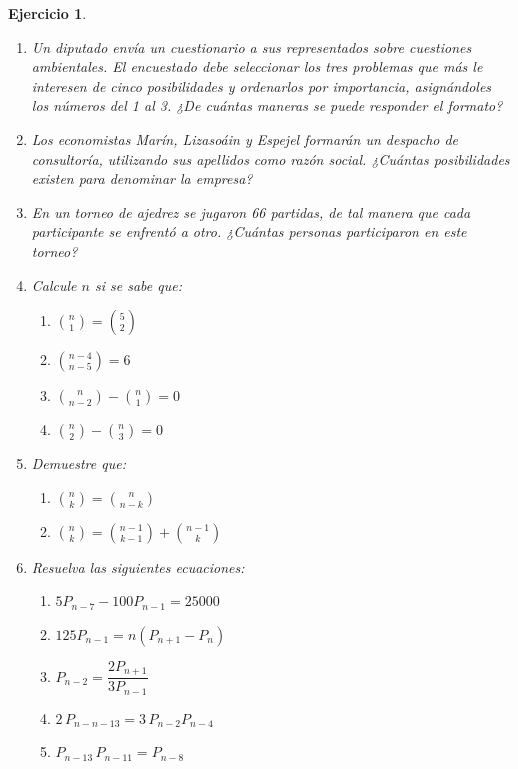 \documentclass[12pt,twoside]{article}
\newtheorem{Ejer}{Ejercicio}
\begin{document}
\begin{Ejer}
\begin{enumerate}

\item Un diputado envía un cuestionario a sus representados sobre cuestiones ambientales. El encuestado debe seleccionar los tres problemas que más le interesen de cinco posibilidades y ordenarlos por importancia, asignándoles los números del 1 al 3. ¿De cuántas maneras se puede responder el formato?

\item Los economistas Marín, Lizasoáin y Espejel formarán un despacho de consultoría, utilizando sus apellidos como razón social. ¿Cuántas posibilidades existen para denominar la empresa?

\item En un torneo de ajedrez se jugaron 66 partidas, de tal manera que cada participante se enfrentó a otro. ¿Cuántas personas participaron en este torneo?

\item Calcule $n$ si se sabe que:
\begin{enumerate}
\item $\binom{n}{1} = \binom{5}{2}$
\item $\binom{n-4}{n-5} = 6$
\item $\binom{n}{n-2} - \binom{n}{1} = 0$
\item $\binom{n}{2} - \binom{n}{3} = 0$
\end{enumerate}

\item Demuestre que:
\begin{enumerate}
\item $\binom{n}{k} = \binom{n}{n-k}$
\item $\binom{n}{k} = \binom{n-1}{k-1} + \binom{n-1}{k}$
\end{enumerate}

\item Resuelva las siguientes ecuaciones:
\begin{enumerate}
\item $5P_{n-7} - 100P_{n-1} = 25000$
\item $125P_{n-1} = n(P_{n+1} - P_n)$
\item $P_{n-2} = \dfrac{2P_{n+1}}{3P_{n-1}}$
\item $2\,P_{n-n-13} = 3\,P_{n-2}P_{n-4}$
\item $P_{n-13}\,P_{n-11} = P_{n-8}$
\end{enumerate}


\end{enumerate}
\end{Ejer}
\end{document}
